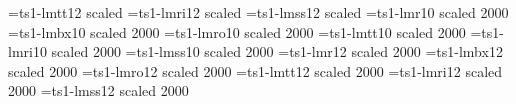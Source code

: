 \font\fourteenctt=ts1-lmtt12 scaled
\font\fourteencit=ts1-lmri12 scaled
\font\fourteencss=ts1-lmss12 scaled
\font\twentycrm=ts1-lmr10 scaled 2000
\font\twentycbf=ts1-lmbx10 scaled 2000
\font\twentycsl=ts1-lmro10 scaled 2000
\font\twentyctt=ts1-lmtt10 scaled 2000
\font\twentycit=ts1-lmri10 scaled 2000
\font\twentycss=ts1-lmss10 scaled 2000
\font\twentyfourcrm=ts1-lmr12 scaled 2000
\font\twentyfourcbf=ts1-lmbx12 scaled 2000
\font\twentyfourcsl=ts1-lmro12 scaled 2000
\font\twentyfourctt=ts1-lmtt12 scaled 2000
\font\twentyfourcit=ts1-lmri12 scaled 2000
\font\twentyfourcss=ts1-lmss12 scaled 2000
\def\t#1{{\edef\next{\the\font}\tcfont\accent"1B\next#1}}
\def\tcchar#1{{\edef\next{\the\font}\tcfont\char#1\next}}
\def\arrowl{{\tcchar{"18}}}
\def\arrowr{{\tcchar{"19}}}
\def\blank{{\tcchar{"20}}}
\def\dollar{{\tcchar{"24}}}
\def\caster{{\tcchar{"2A}}}
\def\sequals{{\tcchar{"2D}}}
\def\anglel{{\tcchar{"3C}}}
\def\angler{{\tcchar{"3E}}}
\def\mho{{\tcchar{"4D}}}
\def\bigcircle{{\tcchar{"4F}}}
\def\Ohm{{\tcchar{"57}}}
\def\bbracketl{{\tcchar{"5B}}}
\def\bbracketr{{\tcchar{"5D}}}
\def\arrowu{{\tcchar{"5E}}}
\def\arrowd{{\tcchar{"5F}}}
\def\textstar{{\tcchar{"62}}}
\def\born{{\tcchar{"63}}}
\def\died{{\tcchar{"64}}}
\def\leaf{{\tcchar{"6C}}}
\def\married{{\tcchar{"6D}}}
\def\music{{\tcchar{"6E}}}
\def\dag{{\tcchar{"84}}}%
\def\ddag{{\tcchar{"85}}}%
\def\doublevert{{\tcchar{"86}}}
\def\perthousand{{\tcchar{"87}}}
\def\bull{{\tcchar{"88}}}
\def\centigrade{{\tcchar{"89}}}
\def\olddollar{{\tcchar{"8A}}}
\def\oldcent{{\tcchar{"8B}}}
\def\florin{{\tcchar{"8C}}}
\def\Colon{{\tcchar{"8D}}}
\def\won{{\tcchar{"8E}}}
\def\naira{{\tcchar{"8F}}}
\def\guarani{{\tcchar{"90}}}
\def\peso{{\tcchar{"91}}}
\def\lira{{\tcchar{"92}}}
\def\recipe{{\tcchar{"93}}}
\def\interrobang{{\tcchar{"94}}}
\def\gnaborretni{{\tcchar{"95}}}
\def\dong{{\tcchar{"96}}}
\def\TM{{\tcchar{"97}}}
\def\pertenth{{\tcchar{"98}}}
\def\npilcrow{{\tcchar{"99}}}
\def\baht{{\tcchar{"9A}}}
\def\numero{{\tcchar{"9B}}}
\def\abzueglich{{\tcchar{"9C}}}
\def\aestimated{{\tcchar{"9D}}}
\def\openbull{{\tcchar{"9E}}}
\def\SM{{\tcchar{"9F}}}
\def\qbrackl{{\tcchar{"A0}}}
\def\qbrackr{{\tcchar{"A1}}}
\def\cent{{\tcchar{"A2}}}
\def\sterling{{\tcchar{"A3}}}
\def\currency{{\tcchar{"A4}}}
\def\yen{{\tcchar{"A5}}}
\def\brokenvert{{\tcchar{"A6}}}
\def\S{{\tcchar{"A7}}}%
\def\copyright{{\tcchar{"A9}}}
\def\feminine{{\tcchar{"AA}}}
\def\copyleft{{\tcchar{"AB}}}
